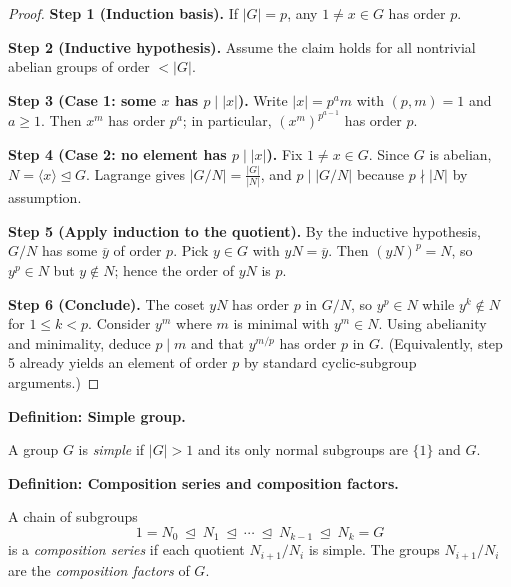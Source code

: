 \documentclass[9pt]{article}
\theoremstyle{definition}
\begin{document}
\begin{proof}
\textbf{Step 1 (Induction basis).} If $|G|=p$, any $1\ne x\in G$ has order $p$.

\textbf{Step 2 (Inductive hypothesis).} Assume the claim holds for all nontrivial abelian groups of order $<|G|$.

\textbf{Step 3 (Case 1: some $x$ has $p\mid |x|$).} Write $|x|=p^a m$ with $(p,m)=1$ and $a\ge1$. Then $x^{m}$ has order $p^a$; in particular, $(x^{m})^{p^{a-1}}$ has order $p$.

\textbf{Step 4 (Case 2: no element has $p\mid |x|$).} Fix $1\ne x\in G$. Since $G$ is abelian, $N=\langle x\rangle\trianglelefteq G$. Lagrange gives $|G/N|=\frac{|G|}{|N|}$, and $p\mid |G/N|$ because $p\nmid |N|$ by assumption.

\textbf{Step 5 (Apply induction to the quotient).} By the inductive hypothesis, $G/N$ has some $\overline{y}$ of order $p$. Pick $y\in G$ with $yN=\overline{y}$. Then $(yN)^p=N$, so $y^p\in N$ but $y\notin N$; hence the order of $yN$ is $p$.

\textbf{Step 6 (Conclude).} The coset $yN$ has order $p$ in $G/N$, so $y^{p}\in N$ while $y^{k}\notin N$ for $1\le k<p$. Consider $y^{m}$ where $m$ is minimal with $y^{m}\in N$. Using abelianity and minimality, deduce $p\mid m$ and that $y^{m/p}$ has order $p$ in $G$. (Equivalently, step 5 already yields an element of order $p$ by standard cyclic-subgroup arguments.)
\end{proof}

\newpage


\noindent\textbf{Definition: Simple group.}

\newpage

A group $G$ is \emph{simple} if $|G|>1$ and its only normal subgroups are $\{1\}$ and $G$.

\newpage


\noindent\textbf{Definition: Composition series and composition factors.}

\newpage

A chain of subgroups
\[
1=N_0\ \trianglelefteq\ N_1\ \trianglelefteq\ \cdots\ \trianglelefteq\ N_{k-1}\ \trianglelefteq\ N_k=G
\]
is a \emph{composition series} if each quotient $N_{i+1}/N_i$ is simple. The groups $N_{i+1}/N_i$ are the \emph{composition factors} of $G$.

\newpage
\end{document}
